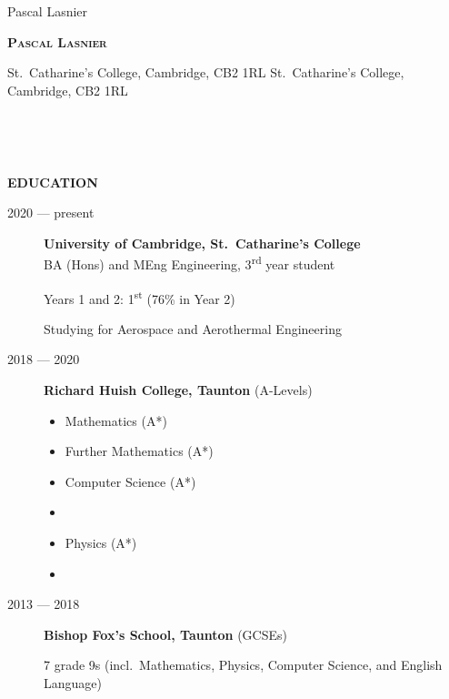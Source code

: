 \documentclass[
  11pt,
  a4paper,
]{article}
\author{}
\date{}
\makeatletter
\providecommand{\tightlist}{%
  \setlength{\itemsep}{0pt}\setlength{\parskip}{0pt}}
\newcommand{\ruledheader}[2]{%
\begingroup
\setlength{\fboxsep}{0pt}%
\colorbox{#1}{%
\parbox[b][1.2ex][t]{35mm}{\begin{tiny}\ \end{tiny}}}%
\parbox[b][1.2ex][t]{5mm}{\begin{tiny}\ \end{tiny}}%
\uppercase{\textbf{#2}}
\endgroup}
\newcommand{\name}{Pascal Lasnier}
\newcommand{\email}{py@lasnier.com}
\newcommand{\phone}{+44 7521 986848}
\newcommand{\website}{github.com/pylasnier}
\newcommand{\address}{St.~Catharine's College, Cambridge, CB2 1RL}
\makeatother
\begin{document}
\ifdefined\name
\begin{Huge}
\hspace{8mm}
\textsc{\textbf{\name}}
\end{Huge}
\fi

\vspace{-7.5mm}

\begin{flushright}
\mbox{\rule[-6mm]{0.8pt}{14mm}\hspace{3mm}%
\parbox{40mm}{\email\\\phone\\\website}}
\end{flushright}

\ifdefined\address
\vspace{-1.2ex}
\hspace{8mm}
\address
\fi

\begin{Large}\vspace{2ex}

\ruledheader{cyan!50!teal}{Education}\end{Large}

\begin{description}
\item[2020 --- present]
\textbf{University of Cambridge, St.~Catharine's College}\\
BA (Hons) and MEng Engineering, 3\textsuperscript{rd} year student

Years 1 and 2: 1\textsuperscript{st} (76\% in Year 2)

Studying for Aerospace and Aerothermal Engineering
\item[2018 --- 2020]
\textbf{Richard Huish College, Taunton} (A-Levels)

\begingroup
\begin{multicols}{3}

\begin{itemize}
\tightlist
\item
  Mathematics (A*)
\item
  Further Mathematics (A*)
\item
  Computer Science (A*)
\item
  ~
\item
  Physics (A*)
\item
  ~
\end{itemize}

\end{multicols}
\vspace{-\parskip}\endgroup
\item[2013 --- 2018]
\textbf{Bishop Fox's School, Taunton} (GCSEs)

7 grade 9s (incl.~Mathematics, Physics, Computer Science, and English
Language)
\end{description}
\end{document}
